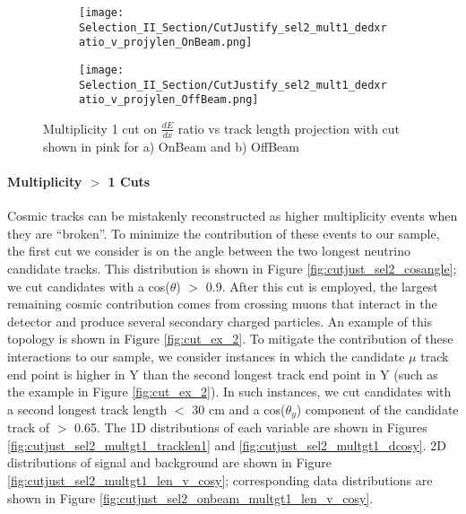 \begin{figure}[H]
\centering
\begin{subfigure}[t]{0.25\textwidth}
  \centering
  \texttt{[image: Selection\_II\_Section/CutJustify\_sel2\_mult1\_dedxratio\_v\_projylen\_OnBeam.png]}  
  \caption{ }
  \end{subfigure} 
  \hspace{1 mm}
  \begin{subfigure}[t]{0.25\textwidth}
    \centering
\texttt{[image: Selection\_II\_Section/CutJustify\_sel2\_mult1\_dedxratio\_v\_projylen\_OffBeam.png]}
  \caption{ }
  \end{subfigure} 
\caption{Multiplicity 1 cut on $\frac{dE}{dx}$ ratio vs track length projection with cut shown in pink for a) OnBeam and b) OffBeam }
\label{fig:cutjust_sel2_onbeam_mult1_dedxratio_v_leny}

\end{figure}

\clearpage
\paragraph{Multiplicity $>$ 1 Cuts}
Cosmic tracks can be mistakenly reconstructed as higher multiplicity events when they are ``broken''. To minimize the contribution of these events to our sample, the first cut we consider is on the angle between the two longest neutrino candidate tracks.  This distribution is shown in Figure \ref{fig:cutjust_sel2_cosangle}; we cut candidates with a cos($\theta$) $>$ 0.9.  After this cut is employed, the largest remaining cosmic contribution comes from crossing muons that interact in the detector and produce several secondary charged particles. An example of this topology is shown in Figure \ref{fig:cut_ex_2}.  To mitigate the contribution of these interactions to our sample, we consider instances in which the candidate $\mu$ track end point is higher in Y than the second longest track end point in Y (such as the example in Figure \ref{fig:cut_ex_2}).  In such instances, we cut candidates with a second longest track length $<$ 30 cm and a cos($\theta_y$) component of the candidate track of $>$ 0.65. The 1D distributions of each variable are shown in Figures \ref{fig:cutjust_sel2_multgt1_tracklen1} and \ref{fig:cutjust_sel2_multgt1_dcosy}.  2D distributions of signal and background are shown in Figure \ref{fig:cutjust_sel2_multgt1_len_v_cosy}; corresponding data distributions are shown in Figure \ref{fig:cutjust_sel2_onbeam_multgt1_len_v_cosy}. 


